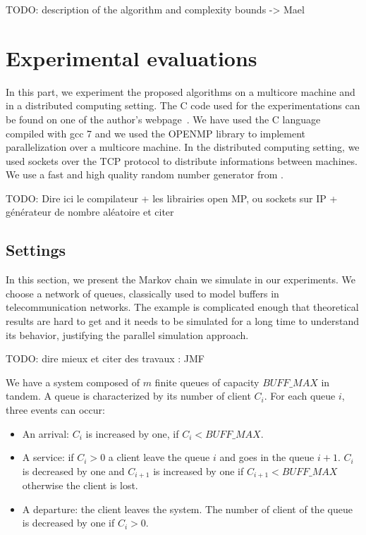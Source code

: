 \documentclass[a4paper,10pt]{article}
\newcommand{\todo}[1]{{\color{red} TODO: {#1}}}
\begin{document}
\todo{description of the algorithm and complexity bounds -> Mael}

\section{Experimental evaluations}\label{sec:expertiments}

In this part, we experiment the proposed algorithms on a multicore machine and in a distributed computing setting. The C code used for the experimentations can be found on one of the author's webpage~\cite{webpage}. We have used the C language compiled with gcc 7 
and we used the OPENMP library to implement parallelization over a multicore machine. 
In the distributed computing setting, we used sockets over the TCP protocol to distribute informations between machines.
We use a fast and high quality random number generator from \cite{}. 

\todo{Dire ici le compilateur + les librairies open MP, ou sockets sur IP + générateur de nombre aléatoire et citer}

\subsection{Settings}
\label{sec:randomproc}

In this section, we present the Markov chain we simulate in our experiments. We choose a network of queues,
classically used to model buffers in telecommunication networks. The example is complicated enough that theoretical results are hard to get and it needs to be simulated for a long time to understand its behavior, justifying the parallel simulation approach.

\todo{dire mieux et citer des travaux : JMF}

We have a system composed of $m$ finite queues of capacity $BUFF\_MAX$ in tandem. A queue is characterized by its number of client $C_i$.  For each queue $i$, three events can occur:
\begin{itemize}
\item An arrival: $C_i$ is increased by one, if $C_i < BUFF\_MAX$.
\item A service: if $C_i > 0$ a client leave the queue $i$ and goes in the queue $i+1$. 
$C_i$ is decreased by one and $C_{i+1}$ is increased by one if $C_{i+1} < BUFF\_MAX$ otherwise the client is lost.
\item A departure: the client leaves the system. The number of client of the queue is decreased by one if $C_i >0$.

\end{itemize}
\end{document}
